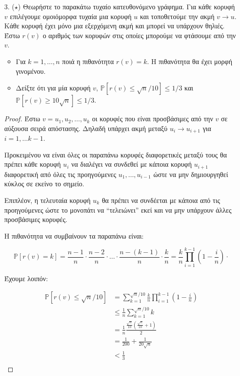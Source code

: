 \documentclass[a4paper, oneside, 11pt]{article}
\theoremstyle{definition}
\newcommand{\pr}{\mathbb{P}}
\begin{document}
\begin{enumerate}
\item[3. ($\star$)]
   Θεωρήστε το παρακάτω τυχαίο κατευθονόμενο γράφημα. Για κάθε κορυφή $v$
   επιλέγουμε ομοιόμορφα τυχαία μια κορυφή $u$ και τοποθετούμε την ακμή
   $v \rightarrow u$. Κάθε κορυφή έχει μόνο μια εξερχόμενη ακμή και μπορεί να
   υπάρχουν θηλιές. Έστω $r(v)$ ο αριθμός των κορυφών στις οποίες μπορούμε να
   φτάσουμε από την $v$.

   \begin{itemize}
      \item Για $k = 1, \ldots, n$ ποιά η πιθανότητα $r(v) = k$. Η πιθανότητα θα
            έχει μορφή γινομένου.
      \item Δείξτε ότι για μία κορυφή $v$, $\pr [ r(v) \leq \sqrt{n} / 10 ]
            \leq 1/3$ και $\pr [ r(v) \geq 10\sqrt{n} ] \leq 1/3$.
   \end{itemize}

   \begin{proof}
      Έστω $v = u_1, u_2, \ldots, u_k$ οι κορυφές που είναι προσβάσιμες από την
      $v$ σε αύξουσα σειρά απόστασης. Δηλαδή υπάρχει ακμή μεταξύ $u_i
      \rightarrow u_{i+1}$ για $i = 1, \ldots k-1$.

      Προκειμένου να είναι όλες οι παραπάνω κορυφές διαφορετικές μεταξύ τους θα
      πρέπει κάθε κορυφή $u_i$ να διαλέγει να συνδεθεί με κάποια κορυφή
      $u_{i+1}$ διαφορετική από όλες τις προηγούμενες $u_1, \ldots, u_{i-1}$
      ώστε να μην δημιουργηθεί κύκλος σε εκείνο το σημείο.

      Επιπλέον, η τελευταία κορυφή $u_k$ θα πρέπει να συνδέεται με κάποια από
      τις προηγούμενες ώστε το μονοπάτι να ``τελειώνει'' εκεί και να μην
      υπάρχουν άλλες προσβάσιμες κορυφές.

      Η πιθανότητα να συμβαίνουν τα παραπάνω είναι:

      \[ \pr[r(v) = k] = \frac{n-1}{n} \cdot \frac{n-2}{n} \cdot \ldots \cdot
         \frac{n-(k-1)}{n} \cdot \frac{k}{n} = \frac{k}{n} \prod_{i=1}^{k-1}
         \left(1 - \frac{i}{n} \right) \cdot \]

      Έχουμε λοιπόν:

      \begin{align*}
         \pr[r(v) \leq \sqrt{n}/10]
            &= \sum_{k=1}^{\sqrt{n}/10} \frac{k}{n} \prod_{i=1}^{k-1} \left(1 -
               \frac{i}{n} \right)\\
            &\leq \frac{1}{n} \sum_{k=1}^{\sqrt{n}/10} k\\
            &=\frac{1}{n} \frac{\frac{\sqrt{n}}{10} \left( \frac{\sqrt{n}}{10} + 1 \right)}{2}\\
            &= \frac{1}{200} + \frac{1}{20\sqrt{n}}\\
            &< \frac{1}{3}\\
      \end{align*}


\end{proof}
\end{enumerate}
\end{document}
